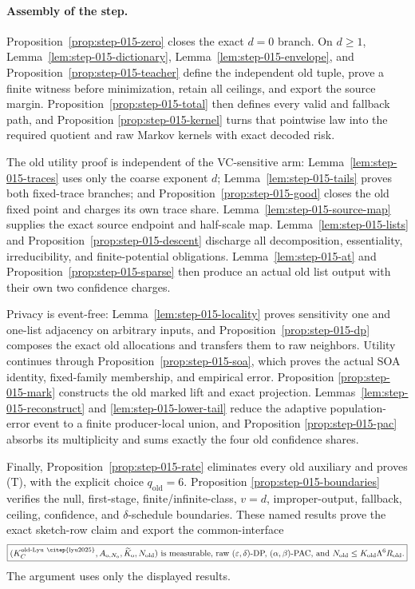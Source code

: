 \paragraph{Assembly of the step.}


Proposition~\ref{prop:step-015-zero} closes the exact \(d=0\) branch. On
\(d\ge1\), Lemma~\ref{lem:step-015-dictionary},
Lemma~\ref{lem:step-015-envelope}, and
Proposition~\ref{prop:step-015-teacher} define the independent old tuple,
prove a finite witness before minimization, retain all ceilings, and export
the source margin. Proposition~\ref{prop:step-015-total} then defines every
valid and fallback path, and Proposition
\ref{prop:step-015-kernel} turns that pointwise law into the required
quotient and raw Markov kernels with exact decoded risk.

The old utility proof is independent of the VC-sensitive arm:
Lemma~\ref{lem:step-015-traces} uses only the coarse exponent \(d\);
Lemma~\ref{lem:step-015-tails} proves both fixed-trace branches; and
Proposition~\ref{prop:step-015-good} closes the old fixed point and charges
its own trace share. Lemma~\ref{lem:step-015-source-map} supplies the exact
source endpoint and half-scale map. Lemma~\ref{lem:step-015-lists} and
Proposition~\ref{prop:step-015-descent} discharge all decomposition,
essentiality, irreducibility, and finite-potential obligations.
Lemma~\ref{lem:step-015-at} and
Proposition~\ref{prop:step-015-sparse} then produce an actual old list
output with their own two confidence charges.

Privacy is event-free: Lemma~\ref{lem:step-015-locality} proves
sensitivity one and one-list adjacency on arbitrary inputs, and
Proposition~\ref{prop:step-015-dp} composes the exact old allocations and
transfers them to raw neighbors. Utility continues through
Proposition~\ref{prop:step-015-soa}, which proves the actual SOA identity,
fixed-family membership, and empirical error. Proposition
\ref{prop:step-015-mark} constructs the old marked lift and exact
projection. Lemmas~\ref{lem:step-015-reconstruct} and
\ref{lem:step-015-lower-tail} reduce the adaptive population-error event to
a finite producer-local union, and Proposition
\ref{prop:step-015-pac} absorbs its multiplicity and sums exactly the four
old confidence shares.

Finally, Proposition~\ref{prop:step-015-rate} eliminates every old
auxiliary and proves (T), with the explicit choice
\(q_{\mathrm{old}}=6\). Proposition
\ref{prop:step-015-boundaries} verifies the null, first-stage,
finite/infinite-class, \(v=d\), improper-output, fallback, ceiling,
confidence, and \(\delta\)-schedule boundaries. These named results prove
the exact sketch-row claim and export the common-interface
\[
\boxed{
(K_C^{\mathrm{old\text{-}Lyu~\citep{lyu2025}}},
A_{\mathrm o,N_{\mathrm o}},
\widetilde K_{\mathrm o},
N_{\mathrm{old}})
\text{ is measurable, raw }(\varepsilon,\delta)\text{-DP, }
(\alpha,\beta)\text{-PAC, and }
N_{\mathrm{old}}\le K_{\mathrm{old}}\Lambda^6R_{\mathrm{old}}.}
\]
The argument uses only the displayed results.



